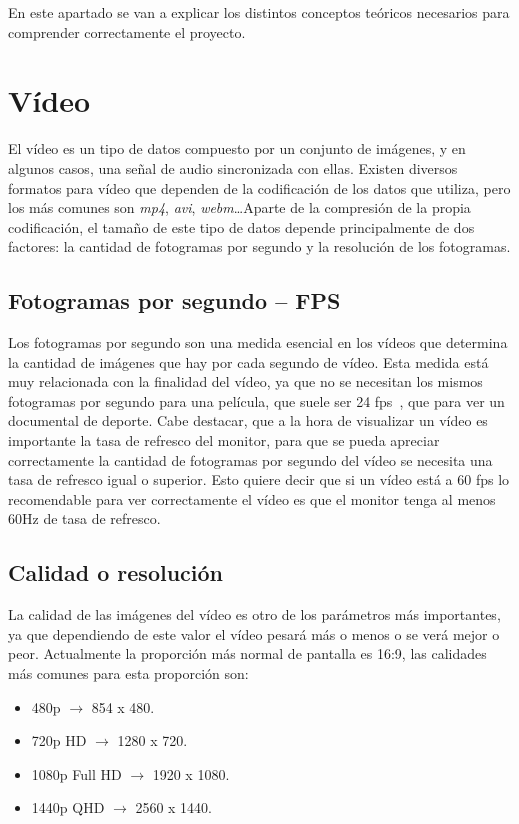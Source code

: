 
En este apartado se van a explicar los distintos conceptos teóricos necesarios para comprender correctamente el proyecto.

\section{Vídeo}
El vídeo es un tipo de datos compuesto por un conjunto de imágenes, y en algunos casos, una señal de audio sincronizada con ellas. Existen diversos formatos para vídeo que dependen de la codificación de los datos que utiliza, pero los más comunes son \textit{mp4}, \textit{avi}, \textit{webm}\ldots Aparte de la compresión de la propia codificación, el tamaño de este tipo de datos depende principalmente de dos factores: la cantidad de fotogramas por segundo y la resolución de los fotogramas.
\subsection{Fotogramas por segundo -- FPS}
Los fotogramas por segundo son una medida esencial en los vídeos que determina la cantidad de imágenes que hay por cada segundo de vídeo. Esta medida está muy relacionada con la finalidad del vídeo, ya que no se necesitan los mismos fotogramas por segundo para una película, que suele ser 24 fps~\cite{fpscine}, que para ver un documental de deporte. Cabe destacar, que a la hora de visualizar un vídeo es importante la tasa de refresco del monitor, para que se pueda apreciar correctamente la cantidad de fotogramas por segundo del vídeo se necesita una tasa de refresco igual o superior. Esto quiere decir que si un vídeo está a 60 fps lo recomendable para ver correctamente el vídeo es que el monitor tenga al menos 60Hz de tasa de refresco.
\subsection{Calidad o resolución}
La calidad de las imágenes del vídeo es otro de los parámetros más importantes, ya que dependiendo de este valor el vídeo pesará más o menos o se verá mejor o peor. Actualmente la proporción más normal de pantalla es 16:9, las calidades más comunes para esta proporción son:
\begin{itemize}
	\item 480p $\rightarrow$ 854 x 480.
	\item 720p HD $\rightarrow$ 1280 x 720.
	\item 1080p Full HD $\rightarrow$ 1920 x 1080.
	\item 1440p QHD $\rightarrow$ 2560 x 1440.
\end{itemize}
